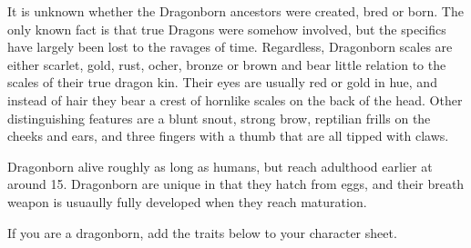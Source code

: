 \documentclass[10pt,twoside]{article}
\begin{document}
It is unknown whether the Dragonborn ancestors were created, bred or born. The only known fact is that true Dragons were somehow involved, but the specifics have largely been lost to the ravages of time. Regardless, Dragonborn scales are either scarlet, gold, rust, ocher, bronze or brown and bear little relation to the scales of their true dragon kin. Their eyes are usually red or gold in hue, and instead of hair they bear a crest of hornlike scales on the back of the head. Other distinguishing features are a blunt snout, strong brow, reptilian frills on the cheeks and ears, and three fingers with a thumb that are all tipped with claws.

Dragonborn alive roughly as long as humans, but reach adulthood earlier at around 15. Dragonborn are unique in that they hatch from eggs, and their breath weapon is usuaully fully developed when they reach maturation.

If you are a dragonborn, add the traits below to your character sheet.
\end{document}
